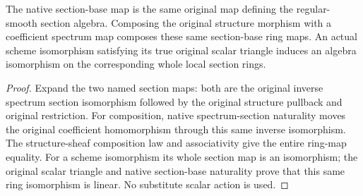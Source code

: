 \begin{lemma}
\label{lem:c0n-original-section-algebra-coherence}
\leanok
The native section-base map is the same original map defining the regular-smooth
section algebra. Composing the original structure morphism with a coefficient
spectrum map composes these same section-base ring maps. An actual scheme
isomorphism satisfying its true original scalar triangle induces an algebra
isomorphism on the corresponding whole local section rings.
\end{lemma}
\begin{proof}
Expand the two named section maps: both are the original inverse spectrum
section isomorphism followed by the original structure pullback and original
restriction. For composition, native spectrum-section naturality moves the
original coefficient homomorphism through this same inverse isomorphism.
The structure-sheaf composition law and associativity give the entire ring-map
equality. For a scheme isomorphism its whole section map is an isomorphism;
the original scalar triangle and native section-base naturality prove that
this same ring isomorphism is linear. No substitute scalar action is used.
\end{proof}

